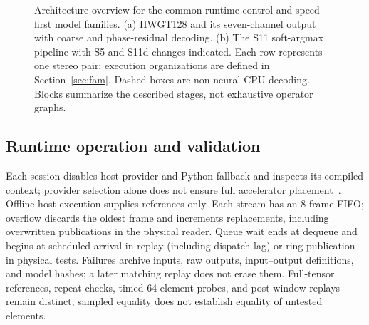 \documentclass[sigconf,review,anonymous]{acmart}
\begin{document}
\begin{figure}[t]
\centering

\caption{Architecture overview for the common runtime-control and speed-first model families. (a) HWGT128 and its seven-channel output with coarse and phase-residual decoding. (b) The S11 soft-argmax pipeline with S5 and S11d changes indicated. Each row represents one stereo pair; execution organizations are defined in Section~\ref{sec:fam}. Dashed boxes are non-neural CPU decoding. Blocks summarize the described stages, not exhaustive operator graphs.}
\label{fig:arch}
\end{figure}

\subsection{Runtime operation and validation}
Each session disables host-provider and Python fallback and inspects its compiled context; provider selection alone does not ensure full accelerator placement~\cite{ortapi,amddeploy}. Offline host execution supplies references only. Each stream has an 8-frame FIFO; overflow discards the oldest frame and increments replacements, including overwritten publications in the physical reader. Queue wait ends at dequeue and begins at scheduled arrival in replay (including dispatch lag) or ring publication in physical tests. Failures archive inputs, raw outputs, input--output definitions, and model hashes; a later matching replay does not erase them. Full-tensor references, repeat checks, timed 64-element probes, and post-window replays remain distinct; sampled equality does not establish equality of untested elements.
\end{document}
